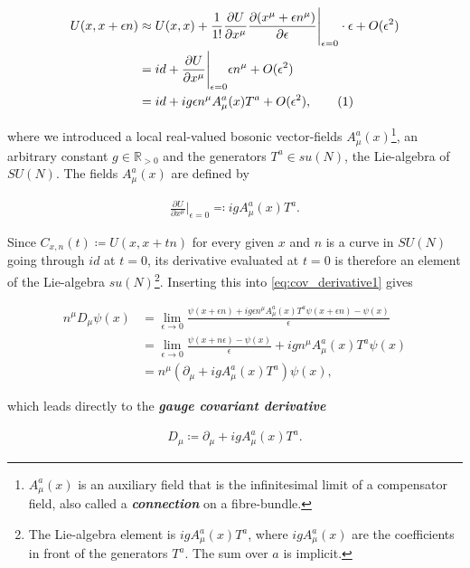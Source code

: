 \documentclass{article}
\newcommand\numberthis{\addtocounter{equation}{1}\tag{\theequation}}
\theoremstyle{plain} %
\theoremstyle{convention} %
\theoremstyle{remark} %
\def\df#1{\textbf{\textit{#1}}}
\numberwithin{equation}{section}
\begin{document}
\begin{align*}
    U(x,x + \epsilon n) &\approx U(x,x) + \frac{1}{1!} \frac{ \partial U }{ \partial x^{\mu} } \frac{ \partial (x^{\mu} + \epsilon n^{\mu}) }{ \partial \epsilon } \Biggr \rvert_{\epsilon = 0} \cdot \epsilon + O(\epsilon^2) \\
    &= id + \frac{ \partial U }{ \partial x^{\mu} } \Biggr \rvert_{\epsilon = 0} \epsilon n^{\mu} + O(\epsilon^2) \\
    &= id + i g \epsilon n^{\mu} A_{\mu}^a(x) T^a + O(\epsilon^2), \numberthis \label{eq:compensator1}
\end{align*}

where we introduced a local real-valued bosonic vector-fields $A_{\mu}^a(x)$\footnote{$A_{\mu}^a(x)$ is an auxiliary field that is the infinitesimal limit of a compensator field, also called a \df{connection} on a fibre-bundle.}, an arbitrary constant $g \in \mathbb{R}_{>0}$ and the generators $T^a \in su(N)$, the Lie-algebra of $SU(N)$. The fields $A_{\mu}^a(x)$ are defined by

\begin{align*}
    \frac{ \partial U }{ \partial x^{\mu} } \Biggr \rvert_{\epsilon = 0} \eqqcolon ig A_{\mu}^a(x) T^a.
\end{align*}

Since $C_{x,n}(t) \coloneqq U(x, x + t n)$ for every given $x$ and $n$ is a curve in $SU(N)$ going through $id$ at $t = 0$, its derivative evaluated at $t = 0$ is therefore an element of the Lie-algebra $su(N)$\footnote{The Lie-algebra element is $ig A_{\mu}^a(x) T^a$, where $ig A_{\mu}^a(x)$ are the coefficients in front of the generators $T^a$. The sum over $a$ is implicit.}. Inserting this into \eqref{eq:cov_derivative1} gives

\begin{align*}
    n^{\mu} D_{\mu} \psi(x) &= \lim_{\epsilon \to 0} \frac{ \psi(x + \epsilon n) + i g \epsilon n^{\mu} A_{\mu}^a(x) T^a \psi(x + \epsilon n) - \psi(x) }{\epsilon} \\
    &= \lim_{\epsilon \to 0} \frac{ \psi(x + n \epsilon) - \psi(x) }{\epsilon} + ig n^{\mu} A_{\mu}^a(x) T^a \psi(x) \\
    &= n^{\mu} \left( \partial_{\mu} + ig A_{\mu}^a(x) T^a \right) \psi(x),
\end{align*}

which leads directly to the \df{gauge covariant derivative}

\begin{align}
    D_{\mu} \coloneqq \partial_{\mu} + ig A_{\mu}^a(x) T^a. \label{eq:cov_derivative}
\end{align}
\end{document}
